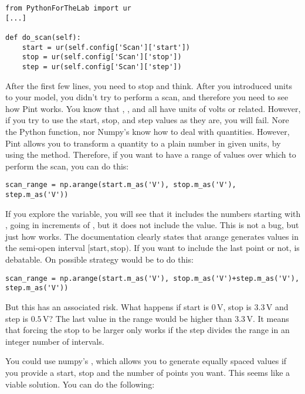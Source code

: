 \begin{verbatim}
from PythonForTheLab import ur
[...]

def do_scan(self):
    start = ur(self.config['Scan']['start'])
    stop = ur(self.config['Scan']['stop'])
    step = ur(self.config['Scan']['step'])
\end{verbatim}

After the first few lines, you need to stop and think. After you introduced units to your model, you didn't try to perform a scan, and therefore you need to see how Pint works. You know that , , and  all have units of volts or related. However, if you try to use the start, stop, and step values as they are, you will fail. Nore the Python  function, nor Numpy's  know how to deal with quantities. However, Pint allows you to transform a quantity to a plain number in given units, by using the  method. Therefore, if you want to have a range of values over which to perform the scan, you can do this:

\begin{verbatim}
scan_range = np.arange(start.m_as('V'), stop.m_as('V'), step.m_as('V'))
\end{verbatim}

If you explore the  variable, you will see that it includes the numbers starting with , going in increments of , but it does not include the  value. This is not a bug, but just how  works. The documentation clearly states that arange generates values in the semi-open interval $[\textrm{start}, \textrm{stop})$. If you want to include the last point or not, is debatable. On possible strategy would be to do this:

\begin{verbatim}
scan_range = np.arange(start.m_as('V'), stop.m_as('V')+step.m_as('V'), step.m_as('V'))
\end{verbatim}

But this has an associated risk. What happens if start is $0\,\textrm{V}$, stop is $3.3\,\textrm{V}$ and step is $0.5\,\textrm{V}$? The last value in the range would be higher than $3.3\,\textrm{V}$. It means that forcing the stop to be larger only works if the step divides the range in an integer number of intervals.

You could use numpy's , which allows you to generate equally spaced values if you provide a start, stop and the number of points you want. This seems like a viable solution. You can do the following:

